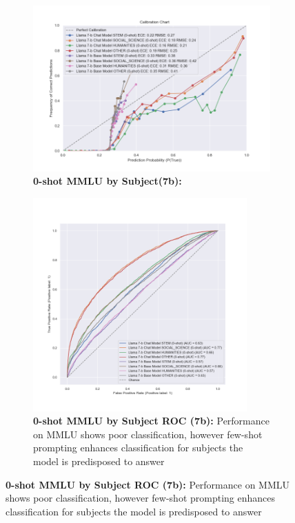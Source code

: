 \documentclass[11pt]{article}
\begin{document}
\begin{figure}
     \centering
     \begin{subfigure}[b]{0.60\textwidth}
         \centering \includegraphics[width=1.1\textwidth]{figures/0-shot-MMLU-subjects-7b.png}
         \caption{\textbf{0-shot MMLU by Subject(7b):} }
         \label{fig:0-shot-MMLU-subjects-7b}
     \end{subfigure}
     \hfill
     \begin{subfigure}[b]{0.38\textwidth}
         \centering \includegraphics[width=0.9\textwidth]{figures/0-shot-MMLU-subjects-7b-roc.png}
         \caption{\textbf{0-shot MMLU by Subject ROC (7b):} Performance on MMLU shows poor classification, however few-shot prompting enhances classification for subjects the model is predisposed to answer}
         \label{fig:0-shot-MMLU-subjects-7b-roc}
    \end{subfigure}
    

\end{figure}
\end{document}
